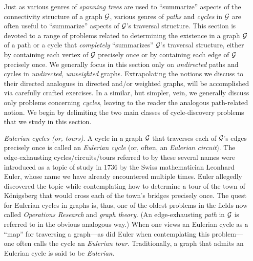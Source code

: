 Just as various genres of {\it spanning trees} are used to
``summarize'' aspects of the connectivity structure of a 
graph $\mbox{$\cal G$}$, various genres of {\it paths} and {\it cycles} in $\mbox{$\cal G$}$ are
often useful to ``summarize'' aspects of $\mbox{$\cal G$}$'s traversal structure.
This section is devoted to a range of problems related to determining
the existence in a graph $\mbox{$\cal G$}$ of a path or a cycle that {\em
  completely} ``summarizes'' $\mbox{$\cal G$}$'s traversal structure, either by
containing each vertex of $\mbox{$\cal G$}$ precisely once or by containing each edge
of $\mbox{$\cal G$}$ precisely once.  We generally focus in this section only
on {\em undirected} paths and cycles in {\em undirected}, {\em
  unweighted} graphs.  Extrapolating the notions we discuss to their
directed analogues in directed and/or weighted graphs, will be
accomplished via carefully crafted exercises.  In a similar, but simpler, vein, we 
generally discuss only problems concerning {\em cycles}, leaving to the reader
the analogous path-related notion.  We begin by delimiting the two main
classes of cycle-discovery problems that we study in this section.

\smallskip

 
  
{\it Eulerian cycles (or, tours)}.  A cycle in a graph $\mbox{$\cal G$}$ that
traverses each of $\mbox{$\cal G$}$'s edges precisely once is called an {\it Eulerian cycle}
(or, often, an {\it Eulerian circuit}).  The edge-exhausting cycles/circuits/tours
referred to by these several names were introduced as a topic of study in 1736 
by the Swiss mathematician Leonhard Euler, whose name we have already
encountered multiple times.  Euler allegedly discovered the topic
while contemplating how to determine a tour of the town of K\"{o}nigsberg
that would cross each of the town's bridges precisely once.  The quest
for Eulerian cycles in graphs is, thus, one of the oldest problems in
the fields now called {\it Operations Research} and {\it graph theory}.  
(An edge-exhausting {\em path} in $\mbox{$\cal G$}$ is referred to in
the obvious analogous way.)  When one views an Eulerian cycle as a
``map'' for traversing a graph---as did Euler when contemplating this
problem---one often calls the cycle an {\it Eulerian tour}. Traditionally, a
graph that admits an Eulerian cycle is said to be {\it Eulerian}. 
  
  

\medskip


